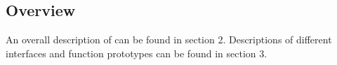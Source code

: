 
\subsection{Overview}

An overall description of \cry{} can be found in section
2. Descriptions of different interfaces and  function
prototypes can be found in section 3.


